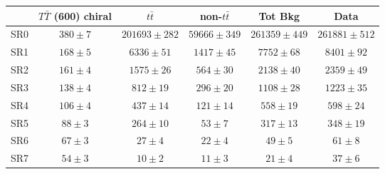 \begin{tabular}{l c c c c c } \toprule\toprule
 & $T\bar{T}$ (600) chiral 		 & $t\bar{t}$ 		 & non-$t\bar{t}$ 		 & Tot Bkg 		 & Data 		 \\ \midrule 
  SR0  & $380 \pm 7$  & $201693 \pm 282$  & $59666 \pm 349$  & $261359 \pm 449$  & $261881 \pm 512$ \\ 
 SR1  & $168 \pm 5$  & $6336 \pm 51$  & $1417 \pm 45$  & $7752 \pm 68$  & $8401 \pm 92$ \\ 
 SR2  & $161 \pm 4$  & $1575 \pm 26$  & $564 \pm 30$  & $2138 \pm 40$  & $2359 \pm 49$ \\ 
 SR3  & $138 \pm 4$  & $812 \pm 19$  & $296 \pm 20$  & $1108 \pm 28$  & $1223 \pm 35$ \\ 
 SR4  & $106 \pm 4$  & $437 \pm 14$  & $121 \pm 14$  & $558 \pm 19$  & $598 \pm 24$ \\ 
 SR5  & $88 \pm 3$  & $264 \pm 10$  & $53 \pm 7$  & $317 \pm 13$  & $348 \pm 19$ \\ 
 SR6  & $67 \pm 3$  & $27 \pm 4$  & $22 \pm 4$  & $49 \pm 5$  & $61 \pm 8$ \\ 
 SR7  & $54 \pm 3$  & $10 \pm 2$  & $11 \pm 3$  & $21 \pm 4$  & $37 \pm 6$ \\ 
\bottomrule\end{tabular}